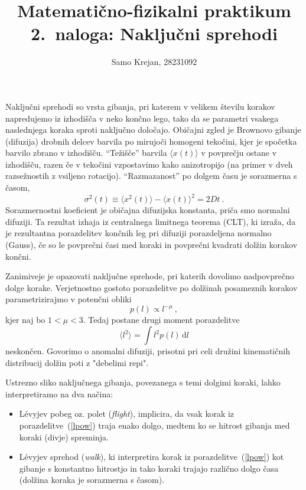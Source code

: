 \documentclass[slovene,11pt,a4paper]{article}
\title{
\sc\large Matematično-fizikalni praktikum \thisyear\\
\bigskip
\bf\Large 2.~naloga: Naključni sprehodi
}
\author{Samo Krejan, 28231092}
\date{}
\newcommand{\dd}{\,\mathrm{d}}
\begin{document}
\maketitle
\vspace{-1cm}

Naključni sprehodi so vrsta gibanja, pri katerem
v velikem številu korakov napredujemo iz izhodišča
v neko končno lego, tako da se parametri vsakega naslednjega
koraka sproti naključno določajo.  Običajni zgled
je Brownovo gibanje (difuzija) drobnih delcev barvila
po mirujoči homogeni tekočini, kjer je spočetka barvilo
zbrano v izhodišču.  ``Težišče'' barvila
$\langle x(t)\rangle$ v povprečju ostane v izhodišču,
razen če v tekočini vzpostavimo kako anizotropijo (na primer
v dveh razsežnostih z vsiljeno rotacijo).  ``Razmazanost''
po dolgem času je sorazmerna s časom,
\begin{equation*}
  \sigma^2(t) \equiv \langle x^2(t)\rangle - \langle x(t)\rangle^2 = 2 D t \>.
\end{equation*}
Sorazmernostni koeficient je običajna difuzijska konstanta,
priča smo normalni difuziji.  Ta rezultat izhaja iz
centralnega limitnega teorema (CLT), ki izraža,
da je rezultantna porazdelitev končnih leg pri difuziji
porazdeljena normalno (Gauss), če so le povprečni časi
med koraki in povprečni kvadrati dolžin korakov končni.

Zanimiveje je opazovati naključne sprehode, pri katerih dovolimo
nadpovprečno dolge korake.  Verjetnostno gostoto porazdelitve
po dolžinah posameznih korakov parametrizirajmo v potenčni obliki
\begin{equation}
p(l) \propto l^{-\mu} \>,
\label{lpow}
\end{equation}
kjer naj bo $1 < \mu < 3$.  Tedaj postane drugi moment porazdelitve
\begin{equation*}
  \langle l^2\rangle = \int l^2 p(l) \dd l
\end{equation*}
neskončen.  Govorimo o anomalni difuziji, prisotni pri celi dru\v zini
kinematičnih distribucij dolžin poti z "debelimi repi".

Ustrezno sliko naključnega gibanja, povezanega s temi dolgimi koraki, lahko
interpretiramo na dva načina:
\begin{itemize}
  \item L\'evyjev pobeg oz. polet ({\sl flight\/}), implicira, da vsak korak iz
  porazdelitve~(\ref{lpow}) traja enako dolgo, medtem ko se hitrost gibanja med koraki (divje) spreminja.
  \item L\'evyjev sprehod ({\sl walk\/}), ki interpretira korak iz porazdelitve~(\ref{lpow}) kot  gibanje s konstantno hitrostjo in
  tako koraki trajajo različno dolgo časa (dolžina koraka je sorazmerna s časom).
\end{itemize}
\end{document}
